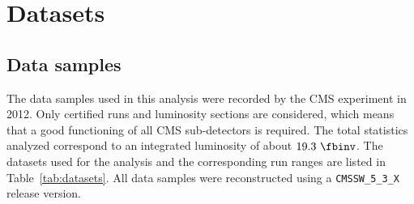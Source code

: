 \section{Datasets}
\label{sec:technicalities}
\subsection{Data samples}
The data samples used in this analysis were recorded by the CMS experiment in 2012.
Only certified runs and luminosity sections are considered, which means that a good functioning
of all CMS sub-detectors is required. The total statistics analyzed correspond to an integrated
luminosity of about $19.3~\fbinv$.
The datasets used for the analysis and the corresponding run ranges are listed in Table~\ref{tab:datasets}.
All data samples were reconstructed using a \texttt{CMSSW\_5\_3\_X} release version.
